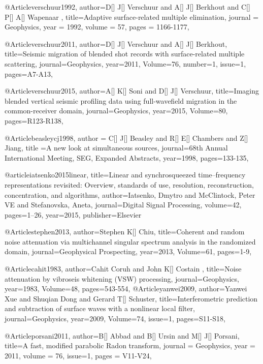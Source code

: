 @Article{verschuur1992,
  author={D[] J[] Verschuur and A[] J[] Berkhout and C[] P[] A[] Wapenaar },
  title={Adaptive surface-related multiple elimination},
  journal = 	 {Geophysics},
  year = 	 1992,
  volume =	 57,
  pages =	 {1166-1177},
}

@Article{verschuur2011,
  author={D[] J[] Verschuur and A[] J[] Berkhout},
  title={Seismic migration of blended shot records with surface-related multiple scattering},
  journal={Geophysics},
  year=2011,
  Volume=76,
  number=1,
  issue=1,
  pages={A7-A13},
}

@Article{verschuur2015,
  author={A[] K[] Soni and D[] J[] Verschuur},
  title={Imaging blended vertical seismic profiling data using full-wavefield migration in the common-receiver domain},
  journal={Geophysics},
  year=2015,
  Volume=80,
  pages={R123-R138},
}


@Article{beasleycj1998,
  author = {C[] J[] Beasley and R[] E[] Chambers and Z[] Jiang},
  title ={A new look at simultaneous sources},
  journal={68th Annual International Meeting, SEG, Expanded Abstracts},
  year=1998,
  pages={133-135},
}

@article{iatsenko2015linear,
  title={Linear and synchrosqueezed time--frequency representations revisited: Overview, standards of use, resolution, reconstruction, concentration, and algorithms},
  author={Iatsenko, Dmytro and McClintock, Peter VE and Stefanovska, Aneta},
  journal={Digital Signal Processing},
  volume={42},
  pages={1--26},
  year={2015},
  publisher={Elsevier}
}


@Article{stephen2013,
  author={Stephen K[] Chiu},
  title={Coherent and random noise attenuation via multichannel singular spectrum analysis in the randomized domain},
  journal={Geophysical Prospecting},
  year=2013,
  Volume=61,
  pages={1-9},
}


@Article{cahit1983,
  author={Cahit Coruh and John K[] Costain },
  title={Noise attenuation by vibroseis whitening (VSW) processing},
  journal={Geophysics},
  year=1983,
  Volume=48,
  pages={543-554},
}
@Article{yanwei2009,
  author={Yanwei Xue and Shuqian Dong and Gerard T[] Schuster},
  title={Interferometric prediction and subtraction of surface waves with a nonlinear local filter},
  journal={Geophysics},
  year=2009,
  Volume=74,
  issue=1,
  pages={S11-S18},
}





@Article{porsani2011,
  author={B[] Abbad and B[] Ursin and M[] J[] Porsani},
  title={A fast, modified parabolic Radon transform},
  journal = 	 {Geophysics},
  year = 	 2011,
  volume =	 76,
  issue=1,
  pages =	 {V11-V24},
}



